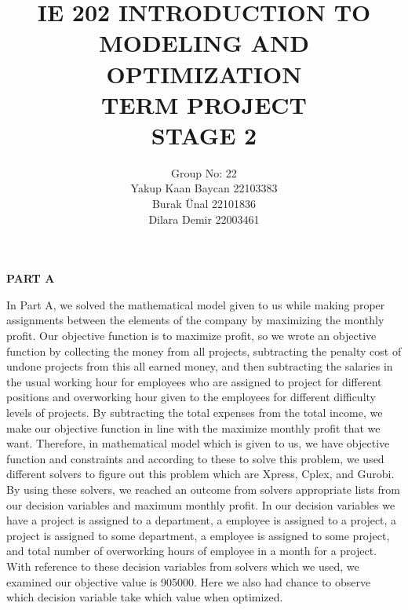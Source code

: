 \documentclass[11pt]{article}
\begin{document}
\title{IE 202 INTRODUCTION TO MODELING AND OPTIMIZATION\\ TERM PROJECT\\STAGE 2 \\}
\author{Group No: 22\\Yakup Kaan Baycan 22103383\\ Burak Ünal  22101836 \\ Dilara Demir  22003461}
\maketitle

\newpage


	\newcommand{\Pf}{\mathbf{P}}
	\newcommand{\UP}[2]{\makebox[0pt]{\smash{\raisebox{1.5em}{$\phantom{#2}#1$}}}#2}
	\newcommand{\LF}[1]{\makebox[0pt]{$#1$\hspace{4.5em}}}
	
\begin{center}
{\bf PART A }
\end{center}
In Part A, we solved the mathematical model given to us while making proper assignments between the elements of the company by maximizing the monthly profit. Our objective function is to maximize profit, so we wrote an objective function by collecting the money from all projects, subtracting the penalty cost of undone projects from this all earned money, and then subtracting the salaries in the usual working hour for employees who are assigned to project for different positions  and overworking hour given to the employees for different difficulty levels of projects. By subtracting the total expenses from the total income, we make our objective function in line with the maximize monthly profit that we want. Therefore,  in mathematical model which is given to us, we have objective function and constraints and according to these to solve this problem, we used different solvers to figure out this problem which are Xpress, Cplex, and Gurobi. By using these solvers, we reached an outcome from solvers appropriate lists from our decision variables and maximum monthly profit. In our decision variables we have a project is assigned to a department, a employee is assigned to a project, a project is assigned to some department, a employee is assigned to some project, and total number of overworking hours of employee in a month for a project. With reference to these decision variables from solvers which we used, we examined our objective value is 905000. Here we also had chance to observe which decision variable take which value when optimized.
\end{document}
